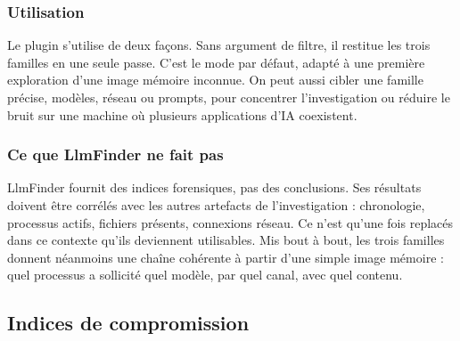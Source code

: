 \subsubsection*{Utilisation}

Le plugin s'utilise de deux façons. Sans argument de filtre, il restitue les trois
familles en une seule passe. C'est le mode par défaut, adapté à une première exploration
d'une image mémoire inconnue. On peut aussi cibler une famille précise, modèles, réseau
ou prompts, pour concentrer l'investigation ou réduire le bruit sur une machine où
plusieurs applications d'IA coexistent.

\subsubsection*{Ce que LlmFinder ne fait pas}

LlmFinder fournit des indices forensiques, pas des conclusions. Ses résultats doivent
être corrélés avec les autres artefacts de l'investigation : chronologie, processus
actifs, fichiers présents, connexions réseau. Ce n'est qu'une fois replacés dans ce
contexte qu'ils deviennent utilisables. Mis bout à bout, les trois familles donnent
néanmoins une chaîne cohérente à partir d'une simple image mémoire : quel processus a
sollicité quel modèle, par quel canal, avec quel contenu.

\subsection{Indices de compromission}

